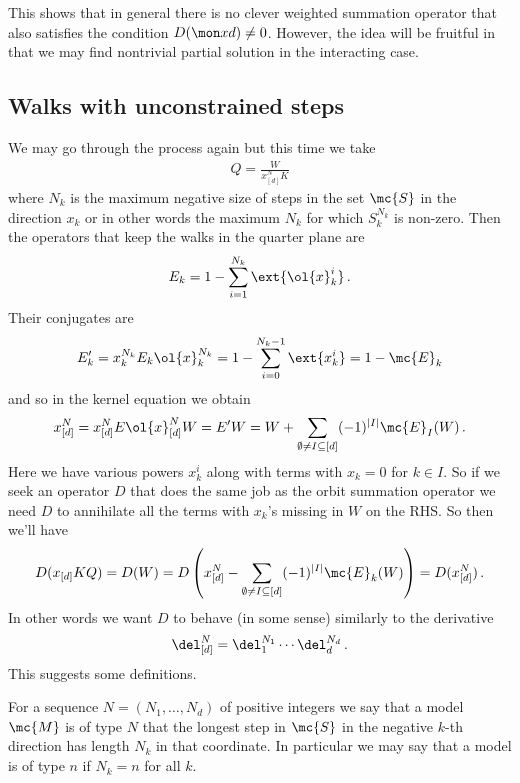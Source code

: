 This shows that in general there is no clever weighted summation operator that also satisfies the condition $D(\mon xd) \neq 0$. However, the idea will be fruitful in that we may find nontrivial partial solution in the interacting case.

\subsection{Walks with unconstrained steps}
We may go through the process again but this time we take
\begin{align}
	Q = \frac{W}{x_{[d]}^N K}
\end{align}
where $N_k$ is the maximum negative size of steps in the set $\mc{S}$ in the direction $x_k$ or in other words the maximum $N_k$ for which $S_k^{N_k}$ is non-zero. Then the operators that keep the walks in the quarter plane are
\begin{align}
	E_k = 1 - \sum_{i=1}^{N_k} \ext{\ol{x}_k^i}\,.
\end{align}
Their conjugates are
\begin{align}
	E_k' = x_k^{N_k} E_k \ol{x}_k^{N_k} = 1 - \sum_{i=0}^{N_k-1}\ext{x_k^i} = 1 -\mc{E}_k
\end{align}
and so in the kernel equation we obtain
\begin{align}
	x_{[d]}^N = x_{[d]}^N E \ol{x}_{[d]}^N W = E' W = W +  \sum_{\emptyset \neq I\subseteq [d]} (-1)^{|I|} \mc{E}_I(W)\,.
\end{align}
Here we have various powers $x_k^i$ along with terms with $x_k = 0$ for $k \in I$. So if we seek an operator $D$ that does the same job as the orbit summation operator we need $D$ to annihilate all the terms with $x_k$'s missing in $W$ on the RHS. So then we'll have
\begin{align}
	D(x_{[d]}KQ) = D(W) = D\left(x_{[d]}^N-\sum_{\emptyset \neq I\subseteq [d]} (-1)^{|I|} \mc{E}_k(W)\right) = D(x_{[d]}^N)\,.
\end{align}
In other words we want $D$ to behave (in some sense) similarly to the derivative
\begin{align}
\del_{[d]}^N = \del_1^{N_1}\cdots \del_d^{N_d}\,.
\end{align}
This suggests some definitions.
\begin{definition}For a sequence $N = (N_1,\ldots, N_d)$ of positive integers we say that a model $\mc{M}$ is of type $N$ that the longest step in $\mc{S}$ in the negative $k$-th direction has length $N_k$ in that coordinate. In particular we may say that a model is of type $n$ if $N_k = n$ for all $k$.
\end{definition}
